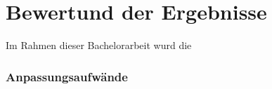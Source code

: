 \chapter{Bewertund der Ergebnisse}
Im Rahmen dieser Bachelorarbeit wurd die 


\subsection{Anpassungsaufwände}
